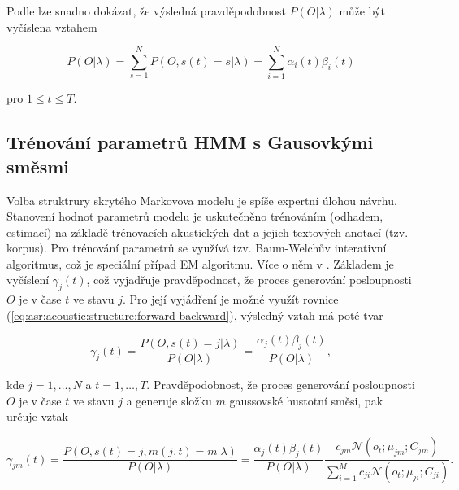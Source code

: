 Podle \cite{Psutka2006} lze snadno dokázat, že výsledná pravděpodobnost $P\left(O|\lambda\right)$ může být vyčíslena vztahem

\begin{equation}
  P\left(O|\lambda\right) = \sum_{s=1}^{N} P\left(O, s\left(t\right) = s | \lambda\right) = \sum_{i = 1}^{N} \alpha_{i}\left(t\right)\beta_{i}\left(t\right)
  \label{eq:asr:acoustic:structure:forward-backward}
\end{equation}

\noindent pro $1 \leq t \leq T$.

\subsection{Trénování parametrů HMM s Gausovkými směsmi}
\label{chap:asr:acoustic:GMM}

Volba struktrury skrytého Markovova modelu je spíše expertní úlohou návrhu. Stanovení hodnot parametrů modelu je uskutečněno trénováním (odhadem, estimací) na základě trénovacích akustických dat a jejich textových anotací (tzv. korpus). Pro trénování parametrů se využívá tzv. Baum-Welchův interativní algoritmus, což je speciální případ EM algoritmu. Více o něm v \cite{Holmes2001}. Základem je vyčíslení $\gamma_{j}\left(t\right)$, což vyjadřuje pravděpodnost, že proces generování posloupnosti $O$ je v čase $t$ ve stavu $j$. Pro její vyjádření je možné využít rovnice (\ref{eq:asr:acoustic:structure:forward-backward}), výsledný vztah má poté tvar

\begin{equation}
  \gamma_{j}\left(t\right) = \frac{P\left(O, s\left(t\right)=j|\lambda\right)}{P\left(O|\lambda\right)} = \frac{\alpha_{j}\left(t\right)\beta_{j}\left(t\right)}{P\left(O|\lambda\right)} ,
   \label{eq:asr:acoustic:structure:gamma}
\end{equation}

\noindent kde $j = 1,\dots,N$ a $t = 1, \dots, T$. Pravděpodobnost, že proces generování posloupnosti $O$ je v čase $t$ ve stavu $j$ a generuje složku $m$ gaussovské hustotní směsi, pak určuje vztak

\begin{equation}
  \gamma_{jm}\left(t\right) = \frac{P\left(O, s\left(t\right)=j, m\left(j,t\right)=m|\lambda\right)}{P\left(O|\lambda\right)} = \frac{\alpha_{j}\left(t\right)\beta_{j}\left(t\right)}{P\left(O|\lambda\right)} \frac{c_{jm}\mathcal{N}\left(o_t;\mu_{jm}; C_{jm}\right)}{\sum_{i=1}^{M} c_{ji} \mathcal{N}\left(o_t;\mu_{ji};C_{ji}\right) }.
  \label{eq:asr:acoustic:structure:gamma:one}
\end{equation}

